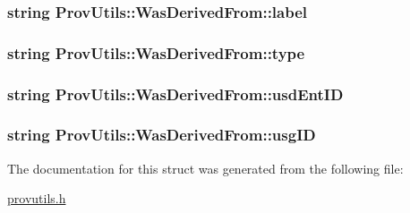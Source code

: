 \hypertarget{struct_prov_utils_1_1_was_derived_from_ac81c10113fc119b56b62b208534d6391}{
\subsubsection[{label}]{\setlength{\rightskip}{0pt plus 5cm}string Prov\-Utils\-::\-Was\-Derived\-From\-::label}}\label{struct_prov_utils_1_1_was_derived_from_ac81c10113fc119b56b62b208534d6391}
\hypertarget{struct_prov_utils_1_1_was_derived_from_a3b9eb43df6283b72c988876f5c471aad}{
\subsubsection[{type}]{\setlength{\rightskip}{0pt plus 5cm}string Prov\-Utils\-::\-Was\-Derived\-From\-::type}}\label{struct_prov_utils_1_1_was_derived_from_a3b9eb43df6283b72c988876f5c471aad}
\hypertarget{struct_prov_utils_1_1_was_derived_from_a8817cd1561cf086b54b5b90f510375c8}{
\subsubsection[{usd\-Ent\-I\-D}]{\setlength{\rightskip}{0pt plus 5cm}string Prov\-Utils\-::\-Was\-Derived\-From\-::usd\-Ent\-I\-D}}\label{struct_prov_utils_1_1_was_derived_from_a8817cd1561cf086b54b5b90f510375c8}
\hypertarget{struct_prov_utils_1_1_was_derived_from_aea9320eb588222ecf79a70528bbe3ae3}{
\subsubsection[{usg\-I\-D}]{\setlength{\rightskip}{0pt plus 5cm}string Prov\-Utils\-::\-Was\-Derived\-From\-::usg\-I\-D}}\label{struct_prov_utils_1_1_was_derived_from_aea9320eb588222ecf79a70528bbe3ae3}


The documentation for this struct was generated from the following file\-:\begin{DoxyCompactItemize}
\item 
\hyperlink{provutils_8h}{provutils.\-h}\end{DoxyCompactItemize}

